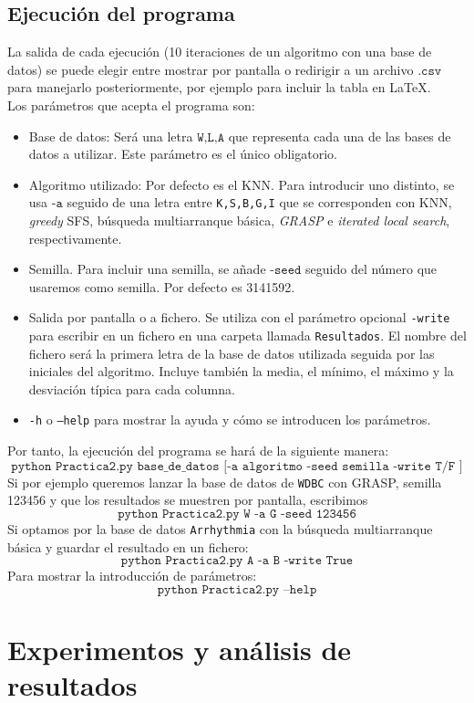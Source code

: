 \documentclass[11pt,leqno]{article}
\begin{document}
\subsection{Ejecución del programa}
La salida de cada ejecución (10 iteraciones de un algoritmo con una base de datos) se puede elegir entre mostrar por pantalla o redirigir a un archivo $\texttt{.csv}$ para manejarlo posteriormente, por ejemplo para incluir la tabla en \LaTeX.\\
Los parámetros que acepta el programa son:
\begin{itemize}
\item Base de datos: Será una letra $\texttt{W,L,A}$ que representa cada una de las bases de datos a utilizar. Este parámetro es el único obligatorio.
\item Algoritmo utilizado: Por defecto es el KNN. Para introducir uno distinto, se usa $\texttt{-a}$ seguido de una letra entre \texttt{K,S,B,G,I} que se corresponden con KNN, \textit{greedy} SFS, búsqueda multiarranque básica, \textit{GRASP} e \textit{iterated local search}, respectivamente.
\item Semilla. Para incluir una semilla, se añade $\texttt{-seed}$ seguido del número que usaremos como semilla. Por defecto es 3141592.
\item Salida por pantalla o a fichero. Se utiliza con el parámetro opcional \texttt{-write} para escribir en un fichero en una carpeta llamada \texttt{Resultados}. El nombre del fichero será la primera letra de la base de datos utilizada seguida por las iniciales del algoritmo. Incluye también la media, el mínimo, el máximo y la desviación típica para cada columna.
\item \texttt{-h} o \texttt{--help} para mostrar la ayuda y cómo se introducen los parámetros.
\end{itemize}

Por tanto, la ejecución del programa se hará de la siguiente manera:
\[ \texttt{python Practica2.py base\_de\_datos [-a algoritmo -seed semilla -write T/F ]} \]
Si por ejemplo queremos lanzar la base de datos de \texttt{WDBC} con GRASP, semilla 123456 y que los resultados se muestren por pantalla, escribimos
\[ \texttt{python Practica2.py W -a G -seed 123456}\]
Si optamos por la base de datos \texttt{Arrhythmia} con la búsqueda multiarranque básica y guardar el resultado en un fichero:
\[ \texttt{python Practica2.py A -a B -write True}\]
Para mostrar la introducción de parámetros:
\[ \texttt{python Practica2.py --help}\]

\section{Experimentos y análisis de resultados}
\end{document}
